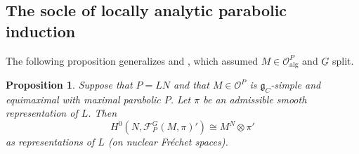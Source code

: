 \documentclass[a4paper]{amsart}
\numberwithin{equation}{section}
\newtheorem{prop}[thm]{Proposition}
\theoremstyle{remark}
\theoremstyle{definition}
\newcommand{\alggrp}[1]{\underline{#1}}
\newcommand{\alg}{\mathrm{alg}}
\begin{document}
\subsection{The socle of locally analytic parabolic induction}
\label{sec:socle-locally-analyt}

The following proposition generalizes \cite[Theorem 3.5]{orlik-schraen} and \cite[Proposition 2.4]{socle1}, which assumed $M \in \mathcal{O}_{\alg}^P$ and $\alggrp{G}$ split.

\begin{prop}\label{prop:N-invariants}
  Suppose that $P = LN$ and that $M \in \mathcal{O}^{P}$ is $\mathfrak{g}_{C}$-simple and equimaximal with maximal parabolic $P$.
  Let $\pi$ be an admissible smooth representation of $L$. Then
  \begin{equation}\label{eq:10}
    H^0(N,\mathcal{F}_P^G(M,\pi)') \cong M^N \otimes \pi'
  \end{equation}
  as representations of $L$ (on nuclear Fr\'echet spaces).
\end{prop}
\end{document}
